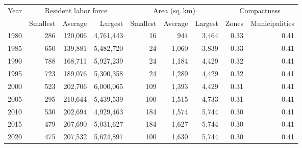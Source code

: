 \begin{tabular}{lrrrrrrrr}
\hline\hline
Year & \multicolumn{3}{c}{Resident labor force} & \multicolumn{3}{c}{Area (sq.\,km)} & \multicolumn{2}{c}{Compactness} \\\cline{2-4} \cline{5-7} \cline{8-9}& Smallest & Average & Largest & Smallest & Average & Largest & Zones & Municipalities \\
\hline
1980 & 286 & 120,006 & 4,761,443 & 16 & 944 & 3,464 & 0.33 & 0.41 \\
1985 & 650 & 139,881 & 5,482,720 & 24 & 1,060 & 3,839 & 0.33 & 0.41 \\
1990 & 788 & 168,711 & 5,927,239 & 24 & 1,184 & 4,429 & 0.32 & 0.41 \\
1995 & 723 & 189,076 & 5,300,358 & 24 & 1,289 & 4,429 & 0.32 & 0.41 \\
2000 & 523 & 202,706 & 6,000,065 & 109 & 1,393 & 4,429 & 0.31 & 0.41 \\
2005 & 295 & 210,644 & 5,439,539 & 100 & 1,515 & 4,733 & 0.31 & 0.41 \\
2010 & 530 & 202,694 & 4,929,463 & 184 & 1,574 & 5,744 & 0.30 & 0.41 \\
2015 & 479 & 207,690 & 5,031,627 & 184 & 1,627 & 5,744 & 0.30 & 0.41 \\
2020 & 475 & 207,532 & 5,624,897 & 100 & 1,630 & 5,744 & 0.30 & 0.41 \\
\hline\hline
\end{tabular}
